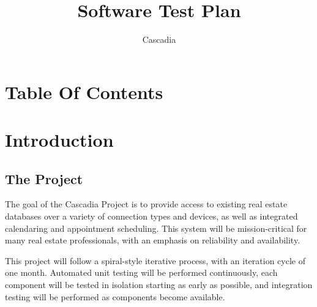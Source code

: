 \documentclass[11pt]{wacomepd}
\begin{document}
\date{Cascadia} 
\title{Software Test Plan} 
\maketitle


\chapter{Table Of Contents}
\tableofcontents
\listoftodos
\clearpage


\chapter{Introduction}


\section{The Project}
The goal of the Cascadia Project is to provide access to existing real estate databases over a
variety of connection types and devices, as well as integrated calendaring and appointment
scheduling.  This system will be mission-critical for many real estate professionals, with an
emphasis on reliability and availability.

This project will follow a spiral-style iterative process, with an iteration cycle of one month.
Automated unit testing will be performed continuously, each component will be tested in isolation
starting as early as possible, and integration testing will be performed as components become
available.
\end{document}
